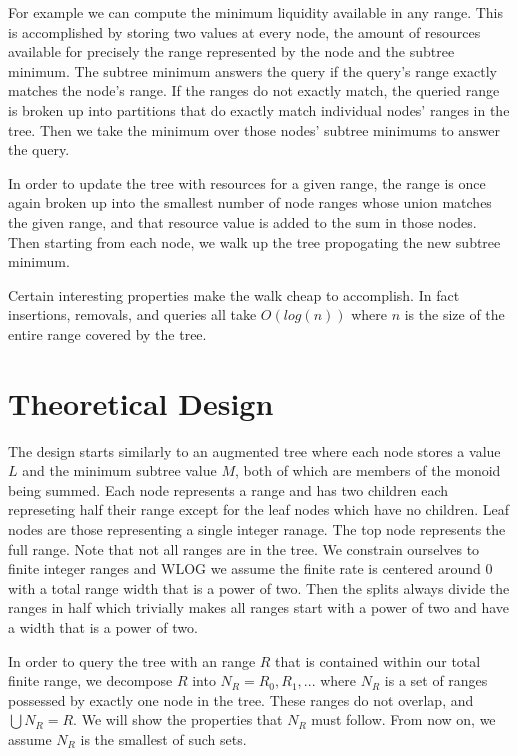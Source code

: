 \documentclass{article}
\begin{document}
For example we can compute the minimum liquidity available in any range.
This is accomplished by storing two values at every node, the amount of
resources available for precisely the range represented by the node and the
subtree minimum. The subtree minimum answers the query if the query's
range exactly matches the node's range. If the ranges do not exactly match, the
queried range is broken up into partitions that do exactly match individual
nodes' ranges in the tree. Then we take the minimum over those nodes' subtree
minimums to answer the query.

In order to update the tree with resources for a given range, the range is once
again broken up into the smallest number of node ranges whose union matches the
given range, and that resource value is added to the sum in those nodes. Then
starting from each node, we walk up the tree propogating the new subtree
minimum.

Certain interesting properties make the walk cheap to accomplish. In fact
insertions, removals, and queries all take $O(log(n))$ where $n$ is the size of
the entire range covered by the tree.

\section{Theoretical Design}

The design starts similarly to an augmented tree where each node stores a value
$L$ and the minimum subtree value $M$, both of which are members of the monoid
being summed. Each node represents a range and has two children each
represeting half their range except for the leaf nodes which have no
children. Leaf nodes are those representing a single integer ranage.
The top node represents the full range. Note that not all ranges
are in the tree. We constrain ourselves to finite integer ranges and WLOG we
assume the finite rate is centered around 0 with a total range width that is a
power of two. Then the splits always divide the ranges in half which trivially makes all
ranges start with a power of two and have a width that is a power of two.

In order to query the tree with an range $R$ that is contained within our total
finite range, we decompose $R$ into $N_R = {R_0,R_1,...}$
where $N_R$ is a set of ranges possessed by exactly one node in the tree. These
ranges do not overlap, and $\bigcup N_R = R$. We will show the properties that
$N_R$ must follow. From now on, we assume $N_R$ is the smallest of such sets.
\end{document}
